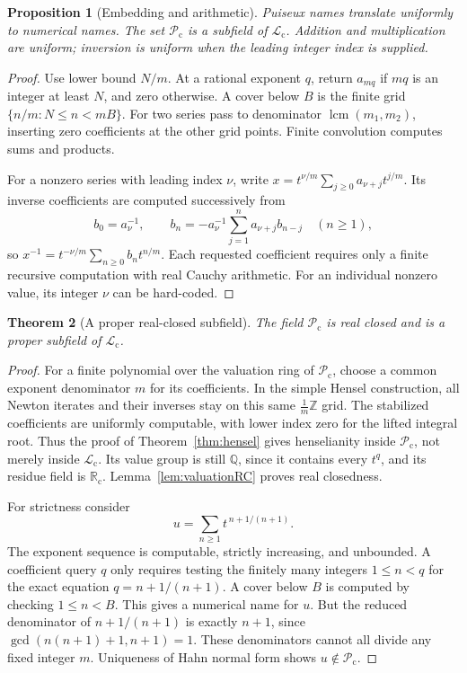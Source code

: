 \documentclass[11pt,letterpaper]{article}
\numberwithin{equation}{section}
\newtheorem{theorem}{Theorem}[section]
\newtheorem{proposition}[theorem]{Proposition}
\theoremstyle{definition}
\theoremstyle{remark}
\newcommand{\Rc}{\mathbb R_{\mathrm c}}
\newcommand{\Lc}{\mathcal L_{\mathrm c}}
\newcommand{\Pc}{\mathcal P_{\mathrm c}}
\newcommand{\Q}{\mathbb Q}
\newcommand{\Z}{\mathbb Z}
\DeclareMathOperator{\lcm}{lcm}
\begin{document}
\begin{proposition}[Embedding and arithmetic]
\label{prop:puiseuxarithmetic}
Puiseux names translate uniformly to numerical names. The set $\Pc$ is a
subfield of $\Lc$. Addition and multiplication are uniform; inversion is
uniform when the leading integer index is supplied.
\end{proposition}
\begin{proof}
Use lower bound $N/m$. At a rational exponent $q$, return $a_{mq}$ if
$mq$ is an integer at least $N$, and zero otherwise. A cover below $B$ is
the finite grid $\{n/m:N\le n<mB\}$. For two series pass to denominator
$\lcm(m_1,m_2)$, inserting zero coefficients at the other grid points.
Finite convolution computes sums and products.

For a nonzero series with leading index $\nu$, write
$x=t^{\nu/m}\sum_{j\ge0}a_{\nu+j}t^{j/m}$. Its inverse coefficients are
computed successively from
\begin{equation}\label{eq:inverseRecurrence}
 b_0=a_\nu^{-1},\qquad
 b_n=-a_\nu^{-1}\sum_{j=1}^n a_{\nu+j}b_{n-j}\quad(n\ge1),
\end{equation}
so $x^{-1}=t^{-\nu/m}\sum_{n\ge0}b_nt^{n/m}$. Each requested coefficient
requires only a finite recursive computation with real Cauchy arithmetic.
For an individual nonzero value, its integer $\nu$ can be hard-coded.
\end{proof}

\begin{theorem}[A proper real-closed subfield]
\label{thm:puiseuxclosed}
The field $\Pc$ is real closed and is a proper subfield of $\Lc$.
\end{theorem}
\begin{proof}
For a finite polynomial over the valuation ring of $\Pc$, choose a common
exponent denominator $m$ for its coefficients. In the simple Hensel
construction, all Newton iterates and their inverses stay on this same
$\frac1m\Z$ grid. The stabilized coefficients are uniformly computable,
with lower index zero for the lifted integral root. Thus the proof of
Theorem~\ref{thm:hensel} gives henselianity inside $\Pc$, not merely inside
$\Lc$. Its value group is still $\Q$, since it contains every $t^q$, and
its residue field is $\Rc$. Lemma~\ref{lem:valuationRC} proves real
closedness.

For strictness consider
\begin{equation}\label{eq:unboundeddenoms}
 u=\sum_{n\ge1}t^{\,n+1/(n+1)}.
\end{equation}
The exponent sequence is computable, strictly increasing, and unbounded.
A coefficient query $q$ only requires testing the finitely many integers
$1\le n<q$ for the exact equation $q=n+1/(n+1)$. A cover below $B$ is
computed by checking $1\le n<B$. This gives a numerical name for $u$.
But the reduced denominator of $n+1/(n+1)$ is exactly $n+1$, since
$\gcd(n(n+1)+1,n+1)=1$. These denominators cannot all divide any fixed
integer $m$. Uniqueness of Hahn normal form shows $u\notin\Pc$.
\end{proof}
\end{document}
